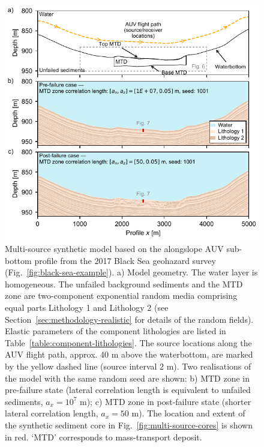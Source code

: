 \documentclass[se,manuscript]{copernicus}
\begin{document}
\begin{figure}[p!]
    \includegraphics[width=12cm]{figures/fig05.pdf}
    \caption{
        Multi-source synthetic model based on the alongslope AUV sub-bottom profile from the 2017 Black Sea geohazard survey (Fig.~\ref{fig:black-sea-example}).
        a) Model geometry. The water layer is homogeneous. The unfailed background sediments and the MTD zone are two-component exponential random media comprising equal parts Lithology 1 and Lithology 2 (see Section~\ref{sec:methodology-realistic} for details of the random fields).
        Elastic parameters of the component lithologies are listed in Table~\ref{table:component-lithologies}.
        The source locations along the AUV flight path, approx. 40 \unit{m} above the waterbottom, are marked by the yellow dashed line (source interval 2 \unit{m}).
        Two realisations of the model with the same random seed are shown:
        b) MTD zone in pre-failure state (lateral correlation length is equivalent to unfailed sediments, $a_x=10^7$ m);
        c) MTD zone in post-failure state (shorter lateral correlation length, $a_x=50$ m).
        The location and extent of the synthetic sediment core in Fig.~\ref{fig:multi-source-cores} is shown in red.
        `MTD' corresponds to mass-transport deposit.
    }
    \label{fig:multi-source-model}
\end{figure}
\end{document}
